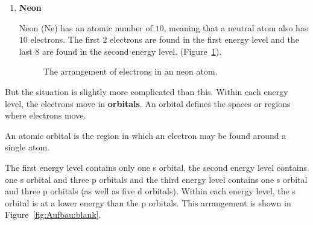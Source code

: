 \begin{enumerate}[noitemsep, label=\textbf{\arabic*}. ]
\item{\textbf{Neon} \\
\begin{minipage}{.4\textwidth}
Neon ($\text{Ne}$) has an atomic number of $10$, meaning that a neutral atom also has $10$ electrons. The first $2$ electrons are found in the first energy level and the last $8$ are found in the second energy level. (Figure~\ref{fig:atom:neon}).
\end{minipage}
\begin{minipage}{.6\textwidth}
\begin{figure}[H]
\begin{center}
\caption{The arrangement of electrons in an neon atom.}
\label{fig:atom:neon}
\end{center}
\end{figure}
\end{minipage}
}
\end{enumerate}

But the situation is slightly more complicated than this. Within each energy level, the electrons move in \textbf{orbitals}. An orbital defines the spaces or regions where electrons move.

 {An atomic orbital is the region in which an electron may be found around a single atom.} 

The first energy level contains only one s orbital, the second energy level contains one s orbital and three p orbitals and the third energy level contains one s orbital and three p orbitals (as well as five d orbitals). Within each energy level, the s orbital is at a lower energy than the p orbitals. This arrangement is shown in Figure~\ref{fig:Aufbau:blank}. 

